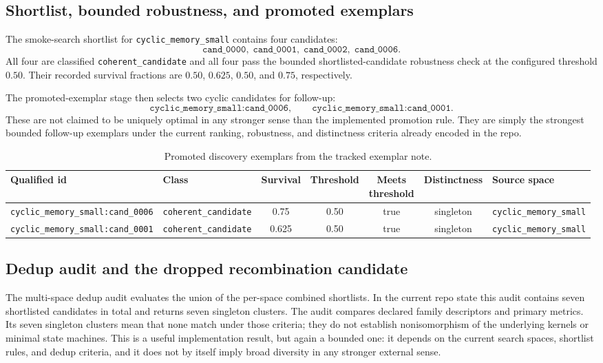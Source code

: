 \documentclass[11pt]{article}
\theoremstyle{definition}
\begin{document}
\subsection{Shortlist, bounded robustness, and promoted exemplars}\label{subsec:discovery-shortlist}
The smoke-search shortlist for \texttt{cyclic\_memory\_small} contains four candidates:
\[
\texttt{cand\_0000},\;
\texttt{cand\_0001},\;
\texttt{cand\_0002},\;
\texttt{cand\_0006}.
\]
All four are classified \texttt{coherent\_candidate} and all four pass the bounded shortlisted-candidate robustness check at the configured threshold $0.50$. Their recorded survival fractions are $0.50$, $0.625$, $0.50$, and $0.75$, respectively.

The promoted-exemplar stage then selects two cyclic candidates for follow-up:
\[
\texttt{cyclic\_memory\_small:cand\_0006},
\qquad
\texttt{cyclic\_memory\_small:cand\_0001}.
\]
These are not claimed to be uniquely optimal in any stronger sense than the implemented promotion rule. They are simply the strongest bounded follow-up exemplars under the current ranking, robustness, and distinctness criteria already encoded in the repo.

\begin{table}[H]
\centering
\caption{Promoted discovery exemplars from the tracked exemplar note.}
\label{tab:discovery-exemplars}
\footnotesize
\setlength{\tabcolsep}{4pt}
\begin{tabularx}{\linewidth}{@{}>{\raggedright\arraybackslash}X>{\raggedright\arraybackslash}Xcccc>{\raggedright\arraybackslash}X@{}}
\toprule
Qualified id & Class & Survival & Threshold & \shortstack{Meets\\threshold} & Distinctness & Source space \\
\midrule
\nolinkurl{cyclic_memory_small:cand_0006} & \nolinkurl{coherent_candidate} & 0.75 & 0.50 & true & singleton & \nolinkurl{cyclic_memory_small} \\
\nolinkurl{cyclic_memory_small:cand_0001} & \nolinkurl{coherent_candidate} & 0.625 & 0.50 & true & singleton & \nolinkurl{cyclic_memory_small} \\
\bottomrule
\end{tabularx}
\end{table}

\subsection{Dedup audit and the dropped recombination candidate}\label{subsec:discovery-dedup}
The multi-space dedup audit evaluates the union of the per-space combined shortlists. In the current repo state this audit contains seven shortlisted candidates in total and returns seven singleton clusters. The audit compares declared family descriptors and primary metrics. Its seven singleton clusters mean that none match under those criteria; they do not establish nonisomorphism of the underlying kernels or minimal state machines. This is a useful implementation result, but again a bounded one: it depends on the current search spaces, shortlist rules, and dedup criteria, and it does not by itself imply broad diversity in any stronger external sense.
\end{document}
